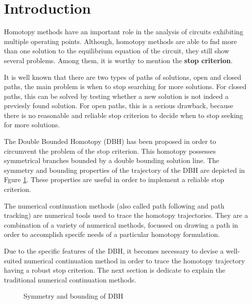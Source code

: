 \documentclass[conference]{IEEEtran}
\begin{document}
\section{Introduction}

Homotopy methods \cite{homo_ArtificialP}\cite{homo_DWolfMulti}\cite{cont_leu1} have an important role in the analysis of
circuits exhibiting multiple operating points.
Although, homotopy methods are able to fnd more than one solution to
the equilibrium equation of the circuit, they still show several problems. Among them, it is worthy to mention the {\bf stop criterion}. 

It is well known that there are two types of paths of solutions,
open and closed paths, the main problem is when to stop searching for
more solutions. For closed paths, this can be solved by testing whether
a new solution is not indeed a previesly found solution. For open paths, this is a serious
drawback, because there is no reasonable and reliable stop criterion
to decide when to stop seeking for more solutions.

The Double Bounded Homotopy (DBH) \cite{homo_iscas05}\cite{homo_iberchip03} has been proposed in order to circumvent the problem
of the stop criterion. This homotopy possesses symmetrical branches bounded by a double bounding solution line. The symmetry and
bounding properties of the trajectory of the DBH are depicted in Fgure \ref{halftrack}. These properties are
useful in order to implement a reliable stop criterion. 

The numerical continuation methods (also called path following and path tracking) are numerical tools used to
trace the homotopy trajectories. They are a combination of a variety of numerical methods, focussed on drawing 
a path in order to accomplish specifc needs of a particular homotopy formulation. 

Due to the specific features of the DBH, it becomes necessary to devise a well-suited numerical continuation method
in order to trace the homotopy trajectory having  a robust stop criterion.
The next section is dedicate to explain the traditional numerical continuation methods.

\begin{figure}[hbtp]
\centerline{
\epsfxsize=62mm
}
\caption{Symmetry and bounding of DBH}
\label{halftrack}
\end{figure}
\end{document}
